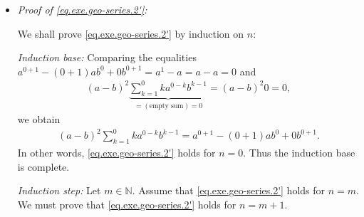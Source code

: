 \documentclass[paper=a4, fontsize=12pt]{scrartcl} %
\newcommand{\NN}{\mathbb{N}} %
\newcommand{\tup}[1]{\left( #1 \right)}
\let\sumnonlimits\sum
\renewcommand{\sum}{\sumnonlimits\limits}
\theoremstyle{plainsl}
\theoremstyle{definition}
\theoremstyle{remark}
\begin{document}
\begin{itemize}
\item \textit{Proof of \eqref{eq.exe.geo-series.2'}:}

We shall prove \eqref{eq.exe.geo-series.2'} by induction on $n$:

\textit{Induction base:}
Comparing the equalities $a^{0+1} - \tup{0+1} a b^0 + 0 b^{0+1}
= a^1 - a = a - a = 0$ and
\begin{align*}
\tup{a-b}^2
\underbrace{\sum_{k = 1}^0 k a^{0-k} b^{k-1}}_{=\tup{\text{empty sum}} = 0}
= \tup{a-b}^2 0 = 0,
\end{align*}
we obtain
\begin{align*}
\tup{a-b}^2 \sum_{k = 1}^0 k a^{0-k} b^{k-1}
= a^{0+1} - \tup{0+1} a b^0 + 0 b^{0+1} .
\end{align*}
In other words, \eqref{eq.exe.geo-series.2'} holds for $n = 0$.
Thus the induction base is complete.

\textit{Induction step:}
Let $m \in \NN$.
Assume that \eqref{eq.exe.geo-series.2'} holds for $n = m$.
We must prove that \eqref{eq.exe.geo-series.2'} holds for $n = m+1$.


\end{itemize}
\end{document}
